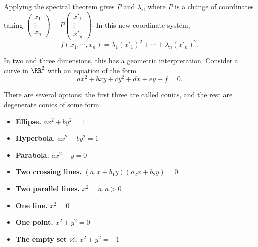 Applying the spectral theorem gives $P$ and $\lambda_i$, where $P$ is a change of coordinates taking $\begin{pmatrix}
x_1 \\ \vdots \\ x_n
\end{pmatrix} = P\begin{pmatrix}
x'_1 \\ \vdots \\ x'_n
\end{pmatrix}.$ In this new coordinate system, 
\[
f(x_1, \cdots, x_n) = \lambda_1(x'_1)^2 + \cdots + \lambda_n(x'_n)^2.
\]

In two and three dimensions, this has a geometric interpretation. Consider a curve in $\RR^2$ with an equation of the form
\[
ax^2 + bxy + cy^2 + dx + ey + f = 0.
\]

There are several options; the first three are called conics, and the rest are degenerate conics of some form.
\begin{itemize}
    \item \textbf{Ellipse.} $ax^2 + by^2 = 1$
    \item \textbf{Hyperbola.} $ax^2 - by^2 = 1$
    \item \textbf{Parabola.} $ax^2 - y = 0$
    \item \textbf{Two crossing lines.} $(a_1x + b_1y)(a_2x + b_2y) = 0$
    \item \textbf{Two parallel lines.} $x^2 = a, a > 0$
    \item \textbf{One line.} $x^2 = 0$ 
    \item \textbf{One point.} $x^2 + y^2 = 0$
    \item \textbf{The empty set $\varnothing$.} $x^2 + y^2 = -1$
\end{itemize}

